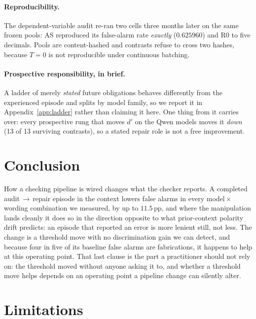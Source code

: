 \documentclass[11pt]{article}
\newcommand{\pp}{\,\text{pp}}
\begin{document}
\paragraph{Reproducibility.}
The dependent-variable audit re-ran two cells three months later on the same frozen pools: AS
reproduced its false-alarm rate \emph{exactly} ($0.625960$) and R0 to five decimals. Pools are
content-hashed and contrasts refuse to cross two hashes, because $T{=}0$ is not reproducible under
continuous batching.

\paragraph{Prospective responsibility, in brief.}
A ladder of merely \emph{stated} future obligations behaves differently from the experienced episode and
splits by model family, so we report it in Appendix~\ref{app:ladder} rather than claiming it here. One
thing from it carries over: every prospective rung that moves $d'$ on the Qwen models moves it
\emph{down} (13 of 13 surviving contrasts), so a stated repair role is not a free improvement.

\section{Conclusion}

How a checking pipeline is wired changes what the checker reports. A completed
audit\,$\to$\,repair episode in the context lowers false alarms in every model\,$\times$\,wording
combination we measured, by up to $11.5\pp$, and where the manipulation lands cleanly it does so in the
direction opposite to what prior-context polarity drift predicts: an episode that reported an error is
more lenient still, not less. The change is a threshold move with no discrimination gain we can detect,
and because four in five of its baseline false alarms are fabrications, it happens to help at this
operating point. That last clause is the part a practitioner should not rely on: the threshold moved
without anyone asking it to, and whether a threshold move helps depends on an operating point a
pipeline change can silently alter.

\section*{Limitations}
\label{sec:limitations}
\end{document}
